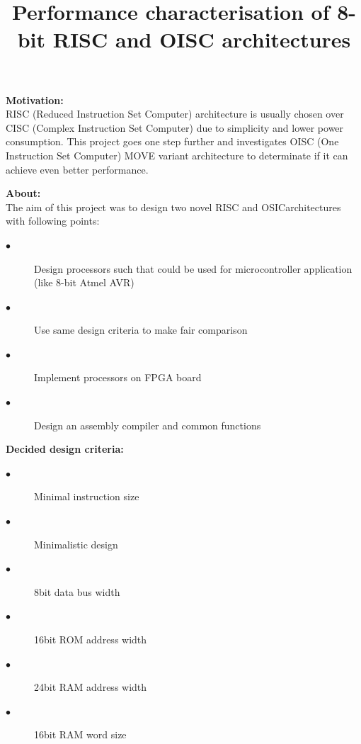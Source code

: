 \documentclass[portrait,color=UCLmidgreen,margin=1.5cm,bannerheight=8cm,logoheight=3.5cm]{uclposter}
\title{Performance characterisation of 8-bit RISC and OISC architectures}
\begin{document}

\maketitle
{}
\newcommand{\strutm}{\rule[-.15\baselineskip]{0pt}{\baselineskip}}

\begin{tcolorbox}[title=Introduction,before skip=10pt]
	\begin{Row}\begin{Cell}{2}
	\textbf{Motivation:}\\
	RISC (Reduced Instruction Set Computer) architecture is usually chosen over CISC (Complex Instruction Set Computer) due to simplicity and lower power consumption. This project goes one step further and investigates OISC (One Instruction Set Computer) MOVE variant architecture to determinate if it can achieve even better performance.
	\end{Cell}\begin{Cell}{2}
	\textbf{About:}\\
	The aim of this project was to design two novel RISC and OSIC​ architectures​ with following points:
	\begin{description}
		\item[$\bullet$] Design processors such that could be used for microcontroller application (like 8-bit Atmel AVR)
		\item[$\bullet$] Use same design criteria to make fair comparison
		\item[$\bullet$] Implement processors on FPGA board
		\item[$\bullet$] Design an assembly compiler and common functions
	\end{description} 
	\end{Cell}\begin{Cell}{1}
	\textbf{Decided design criteria:}
	\begin{description}
		\item[$\bullet$] Minimal instruction size
		\item[$\bullet$] Minimalistic design
		\item[$\bullet$] 8bit data bus width
		\item[$\bullet$] 16bit ROM address width
		\item[$\bullet$] 24bit RAM address width
		\item[$\bullet$] 16bit RAM word size
	\end{description}
	\end{Cell}\end{Row}
\end{tcolorbox}
\end{document}
